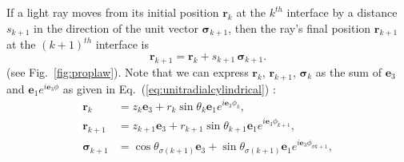 \documentclass[a4paper,twocolumn,superscriptaddress]{revtex4-1}
\begin{document}
If a light ray moves from its initial position $\mathbf r_k$ at the $k^{th}$ 
interface by a distance $s_{k+1}$ in the direction of the unit vector 
$\bm \sigma_{k+1}$, then the ray's final position $\mathbf r_{k+1}$ at the 
$(k+1)^{th}$ interface is \cite{sugonAJP}
\begin{equation} 
  \label{eq:propagation}
  \mathbf r_{k+1} = 
  \mathbf r_k + s_{k+1} \, \bm \sigma_{k+1} .
\end{equation}
(see Fig.~\ref{fig:proplaw}). Note that we can express $\mathbf r_k$, $\mathbf r_{k+1}$, $\bm \sigma_k$ as the 
sum of $\mathbf e_3$ and $\mathbf e_1 e^{i \mathbf e_3 \phi}$ as given in Eq.~(\ref{eq:unitradialcylindrical}) :
\begin{subequations}
  \label{eq:rkrk1sigform}
  \begin{align}
    \label{eq:rkform}
    \mathbf r_k &= z_k
\mathbf e_3 + 
    r_k \sin \theta_k \mathbf e_1 e^{i \mathbf e_3 \phi_k} , 
    \\
    \label{eq:rk1form}
    \mathbf r_{k+1} &= 
z_{k+1}
\mathbf e_3 
   + 
    r_{k+1} \sin \theta_{k+1} \mathbf e_1 e^{i \mathbf e_3 \phi_{k+1}},  %
    \\
    \label{eq:sigmageneral}
    \bm \sigma_{k+1} &= \cos \theta_{\sigma(k+1)} \mathbf e_3 
   + 
    \sin \theta_{\sigma(k+1)} \mathbf e_1 e^{i \mathbf e_3 \phi_{\sigma k+1}} , %
  \end{align}
\end{subequations}
\end{document}
